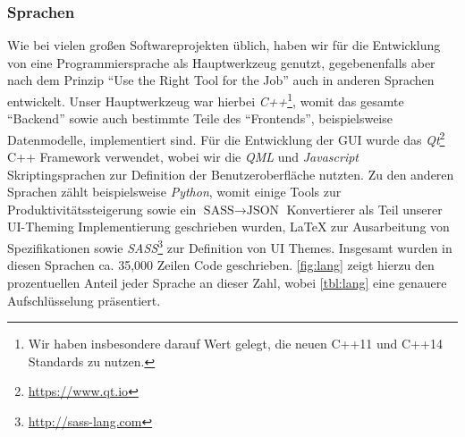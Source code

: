 
\subsubsection{Sprachen}
\label{team:orga-workflow-lang}

Wie bei vielen großen Softwareprojekten üblich, haben wir für die Entwicklung
von \erasim{} eine Programmiersprache als Hauptwerkzeug genutzt, gegebenenfalls
aber nach dem Prinzip ``Use the Right Tool for the Job'' auch in anderen
Sprachen entwickelt. Unser Hauptwerkzeug war hierbei \emph{C++}\footnote{Wir
haben insbesondere darauf Wert gelegt, die neuen C++11 und C++14 Standards zu
nutzen.}, womit das gesamte ``Backend'' sowie auch bestimmte Teile des
``Frontends'', beispielsweise Datenmodelle, implementiert sind. Für die
Entwicklung der GUI wurde das \emph{Qt}\footnote{\url{https://www.qt.io}} C++
Framework verwendet, wobei wir die \emph{QML} und \emph{Javascript}
Skriptingsprachen zur Definition der Benutzeroberfläche nutzten. Zu den anderen
Sprachen zählt beispielsweise \emph{Python}, womit einige Tools zur
Produktivitätssteigerung sowie ein $\text{SASS} \rightarrow \text{JSON}$
Konvertierer als Teil unserer UI-Theming Implementierung geschrieben wurden,
\LaTeX{} zur Ausarbeitung von Spezifikationen sowie
\emph{SASS}\footnote{\url{http://sass-lang.com}} zur Definition von UI Themes.
Insgesamt wurden in diesen Sprachen ca. 35,000 Zeilen Code geschrieben. \autoref{fig:lang} zeigt hierzu den prozentuellen Anteil jeder Sprache an dieser
Zahl, wobei \autoref{tbl:lang} eine genauere Aufschlüsselung präsentiert.

